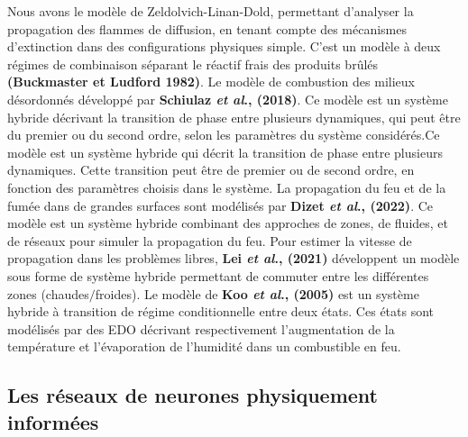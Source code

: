\documentclass[12pt, oneside]{report} %
\theoremstyle{definition}
\theoremstyle{remark}
\begin{document}
	Nous avons le modèle de Zeldolvich-Linan-Dold, permettant d'analyser la propagation des flammes de diffusion, en tenant compte des mécanismes d'extinction dans des configurations physiques simple. C'est un modèle à deux régimes de combinaison séparant le réactif frais des produits brûlés \textbf{(Buckmaster et Ludford 1982)}. Le modèle de combustion des milieux désordonnés développé par \textbf{Schiulaz \textit{et al}., (2018)}. Ce modèle est un système hybride décrivant la transition de phase entre plusieurs dynamiques, qui peut être du premier ou du second ordre, selon les paramètres du système considérés.Ce modèle est un système hybride qui décrit la transition de phase entre plusieurs dynamiques. Cette transition peut être de premier ou de second ordre, en fonction des paramètres choisis dans le système.
 La propagation du feu et de la fumée dans de grandes surfaces sont modélisés par \textbf{Dizet \textit{et al}., (2022)}. Ce modèle est un système hybride combinant des approches de zones, de fluides, et de réseaux pour simuler la propagation du feu. Pour estimer la vitesse de propagation dans les problèmes libres, \textbf{Lei \textit{et al}., (2021)} développent un modèle sous forme de système hybride permettant de commuter entre les différentes zones (chaudes$\slash$froides). Le modèle de \textbf{Koo \textit{et al}., (2005)} est un système hybride à transition de régime conditionnelle entre deux états. Ces états sont modélisés par des EDO décrivant respectivement l'augmentation de la température et l'évaporation de l'humidité dans un combustible en feu.
		
		\subsection{Les réseaux de neurones physiquement informées}
		
\end{document}

